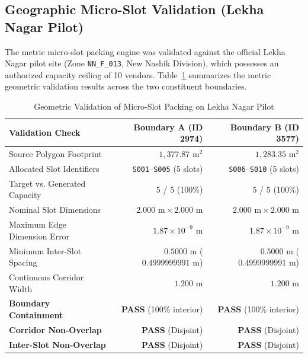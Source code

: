 \subsection{Geographic Micro-Slot Validation (Lekha Nagar Pilot)}
\label{sec:res_microslot}

The metric micro-slot packing engine was validated against the official Lekha Nagar pilot site (Zone \texttt{NN\_F\_013}, New Nashik Division), which possesses an authorized capacity ceiling of 10 vendors. Table~\ref{tab:slot_validation} summarizes the metric geometric validation results across the two constituent boundaries.

\begin{table}[t]
    \caption{Geometric Validation of Micro-Slot Packing on Lekha Nagar Pilot}
    \label{tab:slot_validation}
    \centering
    \begin{tabular}{lrr}
        \toprule
        \textbf{Validation Check} & \textbf{Boundary A (ID 2974)} & \textbf{Boundary B (ID 3577)} \\
        \midrule
        Source Polygon Footprint & $1,377.87\text{ m}^2$ & $1,283.35\text{ m}^2$ \\
        Allocated Slot Identifiers & \texttt{S001}--\texttt{S005} (5 slots) & \texttt{S006}--\texttt{S010} (5 slots) \\
        Target vs. Generated Capacity & 5 / 5 (100\%) & 5 / 5 (100\%) \\
        \midrule
        Nominal Slot Dimensions & $2.000\text{ m} \times 2.000\text{ m}$ & $2.000\text{ m} \times 2.000\text{ m}$ \\
        Maximum Edge Dimension Error & $1.87 \times 10^{-9}\text{ m}$ & $1.87 \times 10^{-9}\text{ m}$ \\
        Minimum Inter-Slot Spacing & $0.5000\text{ m}$ ($0.4999999991\text{ m}$) & $0.5000\text{ m}$ ($0.4999999991\text{ m}$) \\
        Continuous Corridor Width & $1.200\text{ m}$ & $1.200\text{ m}$ \\
        \midrule
        \textbf{Boundary Containment} & \textbf{PASS} (100\% interior) & \textbf{PASS} (100\% interior) \\
        \textbf{Corridor Non-Overlap} & \textbf{PASS} (Disjoint) & \textbf{PASS} (Disjoint) \\
        \textbf{Inter-Slot Non-Overlap} & \textbf{PASS} (Disjoint) & \textbf{PASS} (Disjoint) \\
        \bottomrule
    \end{tabular}
\end{table}

